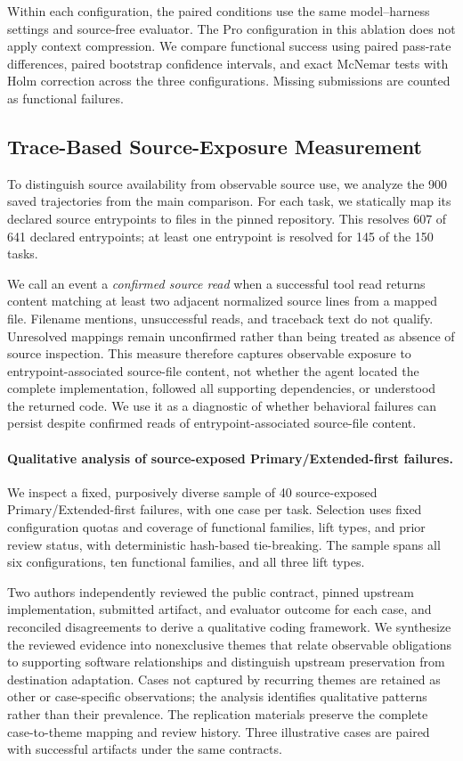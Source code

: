 \documentclass[acmsmall,screen,review,anonymous]{acmart}
\begin{document}
Within each configuration, the paired conditions use the same model--harness
settings and source-free evaluator. The Pro configuration in this ablation does
not apply context compression. We compare functional success using
paired pass-rate differences, paired bootstrap confidence intervals, and exact
McNemar tests with Holm correction across the three configurations. Missing
submissions are counted as functional failures.

\subsection{Trace-Based Source-Exposure Measurement}
\label{sec:source-exposure-protocol}

To distinguish source availability from observable source use, we analyze the
900 saved trajectories from the main comparison. For
each task, we statically map its declared source entrypoints to files in the
pinned repository. This resolves 607 of 641 declared entrypoints; at least one
entrypoint is resolved for 145 of the 150 tasks.

We call an event a \emph{confirmed source read} when a successful tool read
returns content matching at least two adjacent normalized source lines from a
mapped file. Filename mentions, unsuccessful reads, and traceback text do not
qualify. Unresolved mappings remain unconfirmed rather than being treated as
absence of source inspection. This measure therefore captures observable
exposure to entrypoint-associated source-file content, not whether the agent
located the complete implementation, followed all supporting dependencies, or
understood the returned code. We use it as a diagnostic of whether behavioral
failures can persist despite confirmed reads of entrypoint-associated
source-file content.

\paragraph{Qualitative analysis of source-exposed Primary/Extended-first failures.}
We inspect a fixed, purposively diverse sample of 40 source-exposed
Primary/Extended-first failures, with one case per task. Selection uses fixed
configuration quotas and coverage of functional families, lift types, and prior
review status, with deterministic hash-based tie-breaking. The sample spans all
six configurations, ten functional families, and all three lift types.

Two authors independently reviewed the public contract, pinned upstream
implementation, submitted artifact, and evaluator outcome for each case, and
reconciled disagreements to derive a qualitative coding framework. We synthesize
the reviewed evidence into nonexclusive themes that relate observable obligations
to supporting software relationships and distinguish upstream preservation from
destination adaptation. Cases not captured by recurring themes are retained as other or case-specific
observations; the analysis identifies qualitative patterns rather than their
prevalence. The replication materials preserve the complete case-to-theme
mapping and review history. Three illustrative cases are paired with successful
artifacts under the same contracts.
\end{document}
